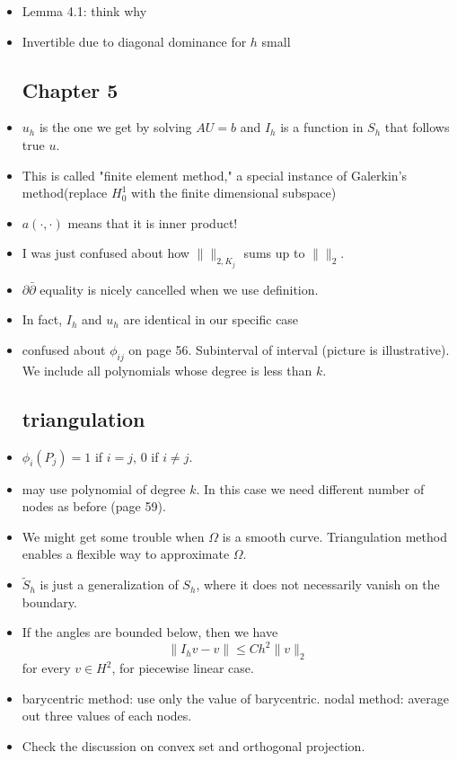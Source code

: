 \documentclass{article}
\theoremstyle{remark}
\begin{document}
\begin{itemize}
    \item Lemma 4.1: think why
    \item Invertible due to diagonal dominance for $h$ small
    \subsection*{Chapter 5}
    \item $u_h$ is the one we get by solving $AU=b$ and $I_h$ is a function in $S_h$ that follows true $u$.
    \item This is called "finite element method," a special instance of Galerkin's method(replace $H^1_0$ with the finite dimensional subspace)
    \item $a(\cdot,\cdot)$ means that it is inner product!
    \item I was just confused about how $\lVert\rVert_{2,K_j}$ sums up to $\lVert\rVert_2$.
    \item $\partial\bar\partial$ equality is nicely cancelled when we use definition.
    \item In fact, $I_h$ and $u_h$ are identical in our specific case
    \item confused about $\phi_{ij}$ on page 56. Subinterval of interval (picture is illustrative). We include all polynomials whose degree is less than $k$.
    \subsection*{triangulation}
    \item $\phi_i(P_j)=1$ if $i=j$, $0$ if $i\neq j$.
    \item may use polynomial of degree $k$. In this case we need different number of nodes as before (page 59).
    \item We might get some trouble when $\Omega$ is a smooth curve. Triangulation method enables a flexible way to approximate $\Omega$.
    \item $\tilde S_h$ is just a generalization of $S_h$, where it does not necessarily vanish on the boundary.
    \item If the angles are bounded below, then we have$$\lVert I_h v-v\rVert\leq Ch^2\lVert v\rVert_2$$ for every $v\in H^2$, for piecewise linear case.
    \item barycentric method: use only the value of barycentric. nodal method: average out three values of each nodes.
    \item Check the discussion on convex set and orthogonal projection.


\end{itemize}
\end{document}
